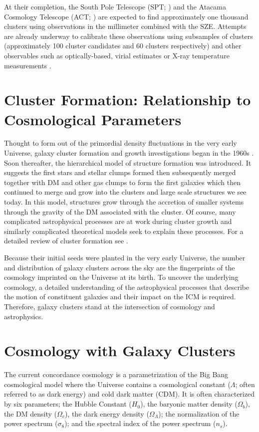 At their completion, the South Pole Telescope (SPT; \citealt{Carlstrom2011}) and the Atacama Cosmology Telescope (ACT; \citealt{Swetz2011}) are expected to find approximately one thousand clusters using observations in the millimeter combined with the SZE. Attempts are already underway to calibrate these observations using subsamples of clusters (approximately 100 cluster candidates and 60 clusters respectively) and other observables such as optically-based, virial estimates or X-ray temperature measurements . 

\section{Cluster Formation: Relationship to Cosmological Parameters}
Thought to form out of the primordial density fluctuations in the very early Universe, galaxy cluster formation and growth investigations began in the 1960s . Soon thereafter, the hierarchical model of structure formation \citep{Press1974, Gott1975, White1978} was introduced. It suggests the first stars and stellar clumps formed then subsequently merged together with DM and other gas clumps to form the first galaxies which then continued to merge and grow into the clusters and large scale structures we see today. In this model, structures grow through the accretion of smaller systems through the gravity of the DM associated with the cluster. Of course, many complicated astrophysical processes are at work during cluster growth and similarly complicated theoretical models seek to explain these processes. For a detailed review of cluster formation see \cite{Kravtsov2012}.

Because their initial seeds were planted in the very early Universe, the number and distribution of galaxy clusters across the sky are the fingerprints of the cosmology imprinted on the Universe at its birth. To uncover the underlying cosmology, a detailed understanding of the astrophysical processes that describe the motion of constituent galaxies and their impact on the ICM is required. Therefore, galaxy clusters stand at the intersection of cosmology and astrophysics. 

\section{Cosmology with Galaxy Clusters}
The current concordance cosmology is a parametrization of the Big Bang cosmological model where the Universe contains a cosmological constant ($\Lambda$; often referred to as dark energy) and cold dark matter (CDM). It is often characterized by six parameters; the Hubble Constant ($H_0$), the baryonic matter density ($\Omega_b$), the DM density ($\Omega_c$), the dark energy density ($\Omega_\Lambda$); the normalization of the power spectrum ($\sigma_8$); and the spectral index of the power spectrum ($n_s$). 


